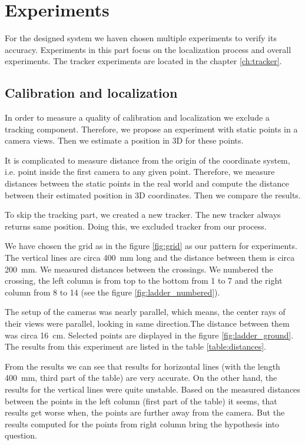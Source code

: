 \chapter{Experiments} 

For the designed system we haven chosen multiple experiments to
verify its accuracy. Experiments in this part focus on the localization process
and overall experiments. The tracker experiments are located in the chapter
\ref{ch:tracker}.

\section{Calibration and localization}

In order to measure a quality of calibration and localization we exclude a
tracking component. Therefore, we propose an experiment with static points in a
camera views. Then we estimate a position in 3D for these points.

It is complicated to measure distance from the origin of the coordinate system,
i.e. point inside the first camera to any given point. Therefore, we measure
distances between the static points in the real world and compute the distance
between their estimated position in 3D coordinates. Then we compare the results.

To skip the tracking part, we created a new tracker.  The new tracker always
returns same position.  Doing this, we excluded tracker from our process.

We have chosen the grid as in the figure \ref{fig:grid} as our pattern for experiments.
The vertical lines are circa 400~mm long and the distance between them is circa
200~mm. We measured distances between the crossings. We numbered the crossing,
the left column is from top to the bottom from 1 to 7 and the right column from
8 to 14 (see the figure \ref{fig:ladder_numbered}).

The setup of the cameras was nearly parallel, which means, the center rays of
their views were parallel, looking in same direction.The distance between them
was circa 16~cm. Selected points are displayed in the figure
\ref{fig:ladder_ground}. The results from this experiment are listed in the
table \ref{table:distances}. 

From the results we can see that results for horizontal lines (with the length
400~mm, third part of the table) are very accurate. On the other hand, the
results for the vertical lines were quite unstable. Based on the measured
distances between the points in the left column (first part of the table) it
seems, that results get worse when, the points are further away from the
camera. But the results computed for the points from right column bring the
hypothesis into question. 

